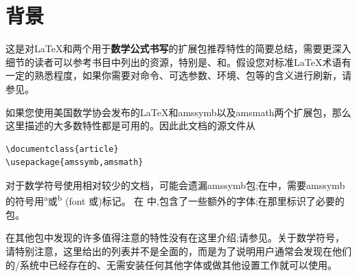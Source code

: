 \section{背景}

这是对\LaTeX{}和两个用于\textbf{数学公式书写}的扩展包推荐特性的简要总结，需要更深入细节的读者可以参考书目中列出的资源，特别是\cite{lamport}、\cite{amsldoc}和\cite{fntguide}。假设您对标准\LaTeX{}术语有一定的熟悉程度，如果你需要对命令、可选参数、环境、包等的含义进行刷新，请参见\cite{lamport}。

如果您使用美国数学协会发布的\LaTeX{}和amssymb以及amsmath两个扩展包，那么这里描述的大多数特性都是可用的。因此此文档的源文件从
\begin{verbatim}
\documentclass{article}
\usepackage{amssymb,amsmath}
\end{verbatim}

对于数学符号使用相对较少的文档，可能会遗漏amssymb包;在中，需要amssymb的符号用\textsuperscript{a}或\textsuperscript{b} (font 或)标记。 在 中,包含了一些额外的字体;在那里标识了必要的包。

在其他包中发现的许多值得注意的特性没有在这里介绍;请参见。关于数学符号，请特别注意，这里给出的列表并不是全面的，而是为了说明用户通常会发现在他们的\lat/系统中已经存在的、无需安装任何其他字体或做其他设置工作就可以使用。


